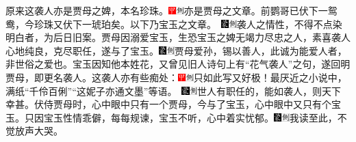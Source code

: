 原来这袭人亦是贾母之婢，本名珍珠。{{\includegraphics[width=3mm]{../Images/00002}\includegraphics[width=3mm]{../Images/00011}\footnotesize \kaishu 亦是贾母之文章。前鹦哥已伏下一鸳鸯，今珍珠又伏下一琥珀矣。以下乃宝玉之文章。　}\includegraphics[width=3mm]{../Images/00006}\includegraphics[width=3mm]{../Images/00011}\footnotesize \kaishu 袭人之情性，不得不点染明白者，为后日旧案。}贾母因溺爱宝玉，生恐宝玉之婢无竭力尽忠之人，素喜袭人心地纯良，克尽职任，遂与了宝玉。{\includegraphics[width=3mm]{../Images/00006}\includegraphics[width=3mm]{../Images/00011}\footnotesize \kaishu 贾母爱孙，锡以善人，此诚为能爱人者，非世俗之爱也。}宝玉因知他本姓花，又曾见旧人诗句上有``花气袭人''之句，遂回明贾母，即更名袭人。这袭人亦有些痴处：{{\includegraphics[width=3mm]{../Images/00002}\includegraphics[width=3mm]{../Images/00011}\footnotesize \kaishu 只如此写又好极！最厌近之小说中，满纸``千伶百俐''``这妮子亦通文墨''等语。　}\includegraphics[width=3mm]{../Images/00006}\includegraphics[width=3mm]{../Images/00011}\footnotesize \kaishu 世人有职任的，能如袭人，则天下幸甚。}伏侍贾母时，心中眼中只有一个贾母，今与了宝玉，心中眼中又只有个宝玉。只因宝玉性情乖僻，每每规谏，宝玉不听，心中着实忧郁。{\includegraphics[width=3mm]{../Images/00006}\includegraphics[width=3mm]{../Images/00011}\footnotesize \kaishu 我读至此，不觉放声大哭。}

